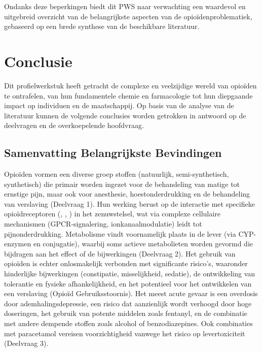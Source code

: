 \documentclass[11pt, a4paper]{report} %
\begin{document}
Ondanks deze beperkingen biedt dit PWS naar verwachting een waardevol en uitgebreid overzicht van de belangrijkste aspecten van de opioïdenproblematiek, gebaseerd op een brede synthese van de beschikbare literatuur.


\chapter{Conclusie}
\label{chap:conclusie}

Dit profielwerkstuk heeft getracht de complexe en veelzijdige wereld van opioïden te ontrafelen, van hun fundamentele chemie en farmacologie tot hun diepgaande impact op individuen en de maatschappij. Op basis van de analyse van de literatuur kunnen de volgende conclusies worden getrokken in antwoord op de deelvragen en de overkoepelende hoofdvraag.

\section{Samenvatting Belangrijkste Bevindingen}
Opioïden vormen een diverse groep stoffen (natuurlijk, semi-synthetisch, synthetisch) die primair worden ingezet voor de behandeling van matige tot ernstige pijn, maar ook voor anesthesie, hoestonderdrukking en de behandeling van verslaving (Deelvraag 1). Hun werking berust op de interactie met specifieke opioïdreceptoren (\textmu, \textkappa, \textdelta) in het zenuwstelsel, wat via complexe cellulaire mechanismen (GPCR-signalering, ionkanaalmodulatie) leidt tot pijnonderdrukking. Metabolisme vindt voornamelijk plaats in de lever (via CYP-enzymen en conjugatie), waarbij soms actieve metabolieten worden gevormd die bijdragen aan het effect of de bijwerkingen (Deelvraag 2). Het gebruik van opioïden is echter onlosmakelijk verbonden met significante risico's, waaronder hinderlijke bijwerkingen (constipatie, misselijkheid, sedatie), de ontwikkeling van tolerantie en fysieke afhankelijkheid, en het potentieel voor het ontwikkelen van een verslaving (Opioïd Gebruiksstoornis). Het meest acute gevaar is een overdosis door ademhalingsdepressie, een risico dat aanzienlijk wordt verhoogd door hoge doseringen, het gebruik van potente middelen zoals fentanyl, en de combinatie met andere dempende stoffen zoals alcohol of benzodiazepines. Ook combinaties met paracetamol vereisen voorzichtigheid vanwege het risico op levertoxiciteit (Deelvraag 3).
\end{document}
